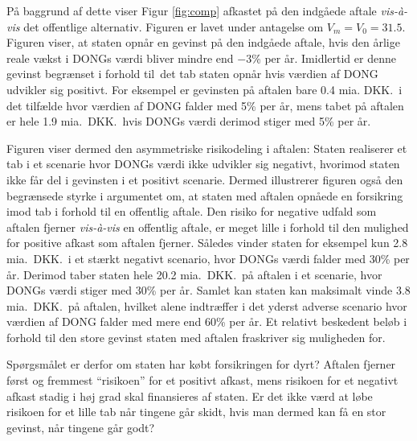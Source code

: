 \documentclass{article}
\begin{document}
På baggrund af dette viser Figur \ref{fig:comp} afkastet på den indgåede aftale \emph{vis-\`{a}-vis} det offentlige alternativ. Figuren er lavet under antagelse om  $V_m=V_0=31.5$. Figuren viser, at staten opnår en gevinst på den indgåede aftale, hvis den årlige reale vækst i DONGs værdi bliver mindre end $-3$\% per år. Imidlertid er denne gevinst begrænset i forhold til\ det tab staten opnår hvis værdien af DONG udvikler sig positivt. For eksempel er gevinsten på aftalen bare 0.4 mia. DKK.\ i det tilfælde hvor værdien af DONG falder med 5\% per år, mens tabet på aftalen er hele 1.9 mia.\ DKK.\ hvis DONGs værdi derimod stiger med 5\% per år.

Figuren viser dermed den asymmetriske risikodeling i aftalen: Staten realiserer et tab i et scenarie hvor DONGs værdi ikke udvikler sig negativt, hvorimod staten ikke får del i gevinsten i et positivt scenarie. Dermed illustrerer figuren også den begrænsede styrke i argumentet om, at staten med aftalen opnåede en forsikring imod tab i forhold til en offentlig aftale. Den risiko for negative udfald som aftalen fjerner \emph{vis-\`{a}-vis} en offentlig aftale, er meget lille i forhold til den mulighed for positive afkast som aftalen fjerner. Således vinder staten for eksempel kun 2.8 mia.\ DKK.\ i et stærkt negativt scenario, hvor DONGs værdi falder med 30\% per år. Derimod taber staten hele 20.2 mia.\ DKK.\ på aftalen i et scenarie, hvor DONGs værdi stiger med 30\% per år. Samlet kan staten kan maksimalt vinde 3.8 mia.\ DKK.\ på aftalen, hvilket alene indtræffer i det yderst adverse scenario hvor værdien af DONG falder med mere end 60\% per år. Et relativt beskedent beløb i forhold til den store gevinst staten med aftalen fraskriver sig muligheden for.

Spørgsmålet er derfor om staten har købt forsikringen for dyrt? Aftalen fjerner først og fremmest \enquote{risikoen} for et positivt afkast, mens risikoen for et negativt afkast stadig i høj grad skal finansieres af staten. Er det ikke værd at løbe risikoen for et lille tab når tingene går skidt, hvis man dermed kan få en stor gevinst, når tingene går godt?
\end{document}
